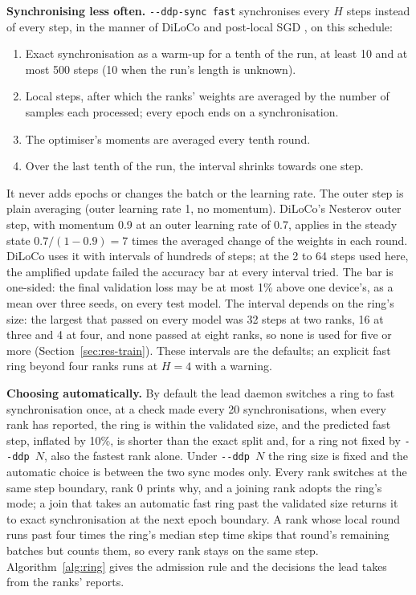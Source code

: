 \textbf{Synchronising less often.} \texttt{-{}-ddp-sync fast} synchronises every
$H$ steps instead of every step, in the manner of DiLoCo
\cite{douillard2023diloco} and post-local SGD \cite{lin2020localsgd}, on this
schedule:
\begin{enumerate}
  \item Exact synchronisation as a warm-up for a tenth of the run, at least 10
  and at most 500 steps (10 when the run's length is unknown).
  \item Local steps, after which the ranks' weights are averaged by the number
  of samples each processed; every epoch ends on a synchronisation.
  \item The optimiser's moments are averaged every tenth round.
  \item Over the last tenth of the run, the interval shrinks towards one step.
\end{enumerate}
It never adds epochs or changes the batch or the learning rate. The outer step
is plain averaging (outer learning rate 1, no momentum). DiLoCo's Nesterov outer
step, with momentum 0.9 at an outer learning rate of 0.7, applies in the steady
state $0.7/(1-0.9) = 7$ times the averaged change of the weights in each round.
DiLoCo uses it with intervals of hundreds of steps; at the 2 to 64 steps used
here, the amplified update failed the accuracy bar at every interval tried. The bar is one-sided: the final
validation loss may be at most 1\% above one device's, as a mean over three
seeds, on every test model. The interval depends on the ring's size: the largest
that passed on every model was 32 steps at two ranks, 16 at three and 4 at four,
and none passed at eight ranks, so none is used for five or more
(Section~\ref{sec:res-train}). These intervals are the
defaults; an explicit fast ring beyond four ranks runs at $H=4$ with a warning.

\textbf{Choosing automatically.} By default the lead daemon switches a ring to
fast synchronisation once, at a check made every 20 synchronisations, when every
rank has reported, the ring is within the
validated size, and the predicted fast step, inflated by 10\%, is shorter than the exact
split and, for a ring not fixed by \texttt{-{}-ddp~$N$}, also the fastest rank
alone. Under \texttt{-{}-ddp~$N$} the ring size is fixed and the automatic
choice is between the two sync modes only. Every rank switches at the same step boundary, rank 0
prints why, and a joining rank adopts the ring's mode; a join that takes an
automatic fast ring past the validated size returns it to exact synchronisation
at the next epoch boundary. A rank whose local round runs past four times the
ring's median step time skips that round's remaining batches but counts them, so
every rank stays on the same step. Algorithm~\ref{alg:ring} gives the admission rule and the decisions the
lead takes from the ranks' reports.

